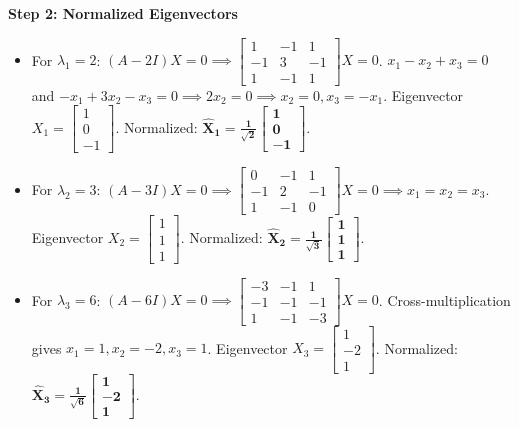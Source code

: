 \begin{solutionbox}
\textbf{Step 2: Normalized Eigenvectors}
\begin{itemize}[leftmargin=6mm]
    \item For $\lambda_1 = 2$: $(A - 2I)X = 0 \implies \begin{bmatrix} 1 & -1 & 1 \\ -1 & 3 & -1 \\ 1 & -1 & 1 \end{bmatrix}X = 0$.
    $x_1 - x_2 + x_3 = 0$ and $-x_1 + 3x_2 - x_3 = 0 \implies 2x_2 = 0 \implies x_2 = 0, x_3 = -x_1$.
    Eigenvector $X_1 = \begin{bmatrix} 1 \\ 0 \\ -1 \end{bmatrix}$. Normalized: $\mathbf{\hat{X}_1 = \frac{1}{\sqrt{2}}\begin{bmatrix} 1 \\ 0 \\ -1 \end{bmatrix}}$.
    \item For $\lambda_2 = 3$: $(A - 3I)X = 0 \implies \begin{bmatrix} 0 & -1 & 1 \\ -1 & 2 & -1 \\ 1 & -1 & 0 \end{bmatrix}X = 0 \implies x_1 = x_2 = x_3$.
    Eigenvector $X_2 = \begin{bmatrix} 1 \\ 1 \\ 1 \end{bmatrix}$. Normalized: $\mathbf{\hat{X}_2 = \frac{1}{\sqrt{3}}\begin{bmatrix} 1 \\ 1 \\ 1 \end{bmatrix}}$.
    \item For $\lambda_3 = 6$: $(A - 6I)X = 0 \implies \begin{bmatrix} -3 & -1 & 1 \\ -1 & -1 & -1 \\ 1 & -1 & -3 \end{bmatrix}X = 0$.
    Cross-multiplication gives $x_1 = 1, x_2 = -2, x_3 = 1$.
    Eigenvector $X_3 = \begin{bmatrix} 1 \\ -2 \\ 1 \end{bmatrix}$. Normalized: $\mathbf{\hat{X}_3 = \frac{1}{\sqrt{6}}\begin{bmatrix} 1 \\ -2 \\ 1 \end{bmatrix}}$.
\end{itemize}


\end{solutionbox}
